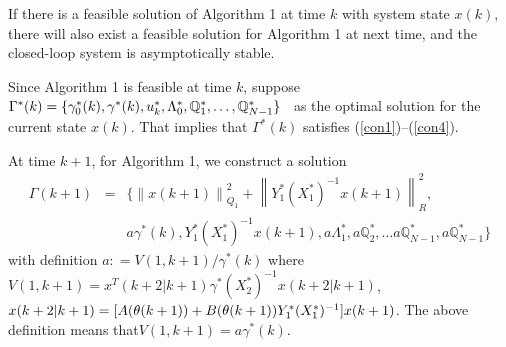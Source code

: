 \documentclass{singlecol-new}
\theoremstyle{TH}{
\newtheorem{lemma}{Lemma}
\newtheorem{theorem}[lemma]{Theorem}
\newtheorem{corrolary}[lemma]{Corrolary}
\newtheorem{conjecture}[lemma]{Conjecture}
\newtheorem{proposition}[lemma]{Proposition}
\newtheorem{claim}[lemma]{Claim}
\newtheorem{stheorem}[lemma]{Wrong Theorem}
\newtheorem{algorithm}{Algorithm}
}
\theoremstyle{THrm}{
\newtheorem{definition}{Definition}[section]
\newtheorem{question}{Question}[section]
\newtheorem{remark}{Remark}
\newtheorem{scheme}{Scheme}
}
\theoremstyle{THhit}{
\newtheorem{case}{Case}[section]
}
\begin{document}
\begin{theorem}
If there is a feasible solution of Algorithm {\rm 1} at time $k$
with system state $x(k)$, there will also exist a feasible solution
for Algorithm {\rm 1} at next time, and the closed-loop system is
asymptotically stable.
\end{theorem}

 Since Algorithm 1 is feasible at time $k$, suppose
~$\Gamma ^*  (k) = \{\gamma^*_0(k), \break \gamma^ *
(k),u_k^*,\Lambda_0^*, \mathbb{Q}_1^ * , \ldots ,\mathbb{Q}_{N -
1}^* \}$~ as the optimal solution for the current state $x(k)$. That
implies that $\Gamma ^ * (k)$ satisfies (\ref{con1})--(\ref{con4}).



At time $ k + 1$, for Algorithm 1, we construct a solution
\begin{eqnarray}
\Gamma (k + 1) &=& \{\left\| {x(k + 1)} \right\|_{Q_1 }^2  + \left\|
{Y_1^ *  (X_1^ *  )^{ - 1} x(k + 1)} \right\|_R^2
,\hspace{1em}\nonumber\\&&a\gamma ^
*  (k),Y_1^ * (X_1^ *  )^{ - 1} x(k + 1),a\Lambda^*_1, a\mathbb{Q}_2^ * , \ldots
a\mathbb{Q}_{N - 1}^ *,a\mathbb{Q}_{N - 1}^ *  \}\nonumber
\end{eqnarray}
with definition $a: = V(1,k+1)/\gamma ^ *  (k)$ where $V(1,k + 1) =
x^T (k + 2|k + 1)\gamma ^ *  (X_2^ *  )^{ - 1} x(k + 2|k + 1)$, $x(k
+ 2|k + 1) = [A(\theta (k + 1)) + B(\theta (k + 1)) Y_1^ * (X_1^
* )^{ - 1}]\break x(k + 1)$. The above definition means that$V(1,k+1)=a\gamma ^ *
(k)$.
\end{document}
